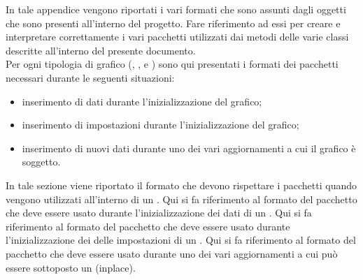 \label{app:schemi}
    In tale appendice vengono riportati i vari formati che sono assunti dagli oggetti  che sono presenti all'interno del progetto. Fare riferimento ad essi per creare e interpretare correttamente i vari pacchetti utilizzati dai metodi delle varie classi descritte all'interno del presente documento.\\
    Per ogni tipologia di grafico (, ,  e ) sono qui presentati i formati dei pacchetti necessari durante le seguenti situazioni:
    \begin{itemize}
        \item inserimento di dati durante l'inizializzazione del grafico;
        \item inserimento di impostazioni durante l'inizializzazione del grafico;
        \item inserimento di nuovi dati durante uno dei vari aggiornamenti a cui il grafico è soggetto.
    \end{itemize}
        In tale sezione viene riportato il formato che devono rispettare i pacchetti  quando vengono utilizzati all'interno di un .
            Qui si fa riferimento al formato del pacchetto  che deve essere usato durante l'inizializzazione dei dati di un .
            \ignoreglo{}
            Qui si fa riferimento al formato del pacchetto  che deve essere usato durante l'inizializzazione dei delle impostazioni di un .
            \ignoreglo{}
            Qui si fa riferimento al formato del pacchetto  che deve essere usato durante uno dei vari aggiornamenti a cui può essere sottoposto un  (inplace).
                \ignoreglo{}

